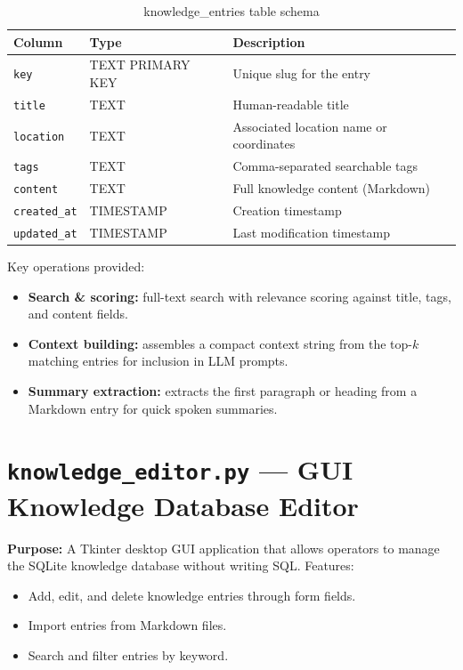 \documentclass[12pt,a4paper]{report}
\begin{document}
\begin{table}[H]
  \centering
  \caption{knowledge\_entries table schema}
  \begin{tabularx}{\linewidth}{L{3cm} L{3cm} X}
    \toprule
    \textbf{Column} & \textbf{Type} & \textbf{Description} \\
    \midrule
    \texttt{key}        & TEXT PRIMARY KEY & Unique slug for the entry \\
    \texttt{title}      & TEXT             & Human-readable title \\
    \texttt{location}   & TEXT             & Associated location name or coordinates \\
    \texttt{tags}       & TEXT             & Comma-separated searchable tags \\
    \texttt{content}    & TEXT             & Full knowledge content (Markdown) \\
    \texttt{created\_at}& TIMESTAMP        & Creation timestamp \\
    \texttt{updated\_at}& TIMESTAMP        & Last modification timestamp \\
    \bottomrule
  \end{tabularx}
\end{table}

Key operations provided:

\begin{itemize}[leftmargin=2em]
  \item \textbf{Search \& scoring:} full-text search with relevance scoring
        against title, tags, and content fields.
  \item \textbf{Context building:} assembles a compact context string from the
        top-$k$ matching entries for inclusion in LLM prompts.
  \item \textbf{Summary extraction:} extracts the first paragraph or heading
        from a Markdown entry for quick spoken summaries.
\end{itemize}

\section{\texttt{knowledge\_editor.py} — GUI Knowledge Database Editor}

\textbf{Purpose:} A Tkinter desktop GUI application that allows operators to
manage the SQLite knowledge database without writing SQL.  Features:

\begin{itemize}[leftmargin=2em]
  \item Add, edit, and delete knowledge entries through form fields.
  \item Import entries from Markdown files.
  \item Search and filter entries by keyword.
\end{itemize}
\end{document}
